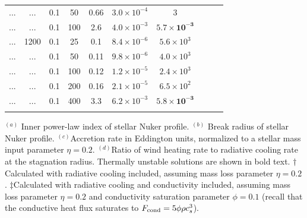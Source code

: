 \documentclass[usenatbib,fleqn]{mn2e}
\begin{document}
\begin{table}
\begin{threeparttable}
\begin{minipage}{18cm}
\begin{tabular}{lccccccccc}
... & ... & 0.1 & 50 & 0.66 & $ 3.0 \times 10^{ -4 }$ & 3 \\
... & ... & 0.1 & 100 & 2.6 & $ 4.0 \times 10^{ -3 }$ & $\mathbf{ 5.7 \times 10^{ -3 }}$ \\
... & 1200 & 0.1 & 25 & 0.1 & $ 8.4 \times 10^{ -6 }$ & $ 5.6 \times 10^{ 3 }$ \\
... & ... & 0.1 & 50 & 0.11 & $ 9.8 \times 10^{ -6 }$ & $ 4.0 \times 10^{ 3 }$ \\
... & ... & 0.1 & 100 & 0.12 & $ 1.2 \times 10^{ -5 }$ & $ 2.4 \times 10^{ 3 }$ \\
... & ... & 0.1 & 200 & 0.16 & $ 2.1 \times 10^{ -5 }$ & $ 6.5 \times 10^{ 2 }$ \\
... & ... & 0.1 & 400 & 3.3 & $ 6.2 \times 10^{ -3 }$ & $\mathbf{ 5.8 \times 10^{ -3 }}$ \\
  \hline

\label{table:models}  
\end{tabular}
\begin{tablenotes}
\item $^{(a)}$ Inner power-law index of stellar Nuker profile.
  $^{(b)}$ Break radius of stellar Nuker profile.  $^{(c)}$Accretion
  rate in Eddington units, normalized to a stellar mass input
  parameter $\eta = 0.2$.  $^{(d)}$Ratio of wind heating rate to
  radiative cooling rate at the stagnation radius.  Thermally unstable
  solutions are shown in bold text.  $\dagger$Calculated with
  radiative cooling included, assuming mass loss parameter $\eta =
  0.2$.  $\ddagger$Calculated with radiative cooling and conductivity
  included, assuming mass loss parameter $\eta = 0.2$ and conductivity
  saturation parameter $\phi = 0.1$ (recall that the
  conductive heat flux saturates to $F_{\rm cond}=5\phi \rho c_s^3$). 
\end{tablenotes}
\end{minipage}
\end{threeparttable}

\end{table}
\end{document}
